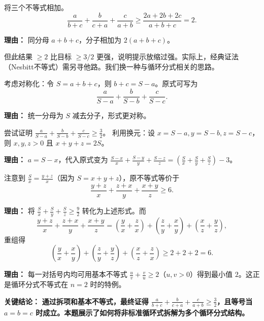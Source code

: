 \begin{examplebox}
\begin{description}[style=nextline, leftmargin=2.8em, labelsep=0.5em, itemsep=0.45em]
    \item[\textbf{第二步（求和得新式）：}] 将三个不等式相加。
    \[
    \frac{a}{b+c} + \frac{b}{c+a} + \frac{c}{a+b} \ge \frac{2a+2b+2c}{a+b+c} = 2.
    \]
    \par\textbf{理由：} 同分母 $a+b+c$，分子相加为 $2(a+b+c)$。
    \par 但此结果 $\ge 2$ 比目标 $\ge 3/2$ 更强，说明提示放缩过强。实际上，经典证法（Nesbitt不等式）需另寻他路。我们换一种与循环分式相关的思路。

    \item[\textbf{第三步（对称化处理）：}] 考虑对称化：令 $S = a+b+c$，则 $b+c = S-a$。原式可写为
    \[
    \frac{a}{S-a} + \frac{b}{S-b} + \frac{c}{S-c}.
    \]
    \par\textbf{理由：} 统一分母为 $S$ 减去分子，形式更对称。

    \item[\textbf{第四步（构造循环和）：}] 尝试证明 $\frac{a}{S-a} + \frac{b}{S-b} + \frac{c}{S-c} \ge \frac{3}{2}$。\newline
    利用换元：设 $x = S-a, y = S-b, z = S-c$，则 $x, y, z > 0$ 且 $x+y+z = 2S$。
    \par\textbf{理由：} $a = S - x$，代入原式变为 $\frac{S-x}{x} + \frac{S-y}{y} + \frac{S-z}{z} = \left(\frac{S}{x}+\frac{S}{y}+\frac{S}{z}\right) - 3$。

    \item[\textbf{第五步（应用循环不等式）：}] 注意到 $\frac{S}{x} = \frac{y+z}{x}$（因为 $S = x+y+z$），原不等式等价于
    \[
    \frac{y+z}{x} + \frac{z+x}{y} + \frac{x+y}{z} \ge 6.
    \]
    \par\textbf{理由：} 将 $\frac{S}{x}+\frac{S}{y}+\frac{S}{z} \ge \frac{9}{2}$ 转化为上述形式。而
    \[
    \frac{y+z}{x} + \frac{z+x}{y} + \frac{x+y}{z} = \left(\frac{y}{x}+\frac{z}{x}\right) + \left(\frac{z}{y}+\frac{x}{y}\right) + \left(\frac{x}{z}+\frac{y}{z}\right),
    \]
    重组得
    \[
    \left(\frac{y}{x}+\frac{x}{y}\right) + \left(\frac{z}{y}+\frac{y}{z}\right) + \left(\frac{x}{z}+\frac{z}{x}\right) \ge 2+2+2 = 6.
    \]
    \par\textbf{理由：} 每一对括号内均可用基本不等式 $\frac{u}{v}+\frac{v}{u} \ge 2$（$u,v>0$）得到最小值 $2$。这正是循环分式不等式在 $n=2$ 时的特例。
\end{description}

\textbf{\textcolor{CExample}{关键结论：}} \textbf{通过拆项和基本不等式，最终证得 $\frac{a}{b+c} + \frac{b}{c+a} + \frac{c}{a+b} \ge \frac{3}{2}$，且等号当 $a=b=c$ 时成立。本题展示了如何将非标准循环式拆解为多个循环分式结构。}
\end{examplebox}
